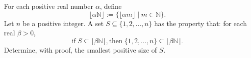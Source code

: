 For each positive real number $\alpha$, define
\[\lfloor \alpha \mathbb{N}\rfloor :=\{\lfloor \alpha m \rfloor\; |\; m\in \mathbb{N}\}.\]
Let $n$ be a positive integer. A set $S\subseteq \{1,2,\ldots,n\}$ has the property that: for each real $\beta >0$,
\[ \text{if}\; S\subseteq \lfloor \beta \mathbb{N} \rfloor, \text{then}\; \{1,2,\ldots,n\} \subseteq \lfloor \beta\mathbb{N}\rfloor.\]
Determine, with proof, the smallest positive size of $S$.
